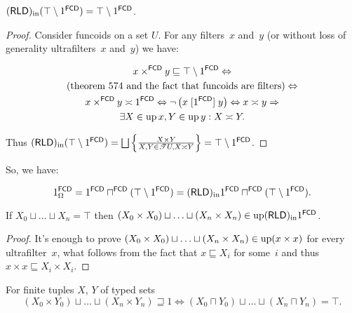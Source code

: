 \begin{prop}
$(\mathsf{RLD})_{\mathrm{in}} (\top \setminus 1^{\mathsf{FCD}}) = \top \setminus 1^{\mathsf{FCD}}$.
\end{prop}

\begin{proof}
Consider funcoids on a set $U$. For any filters~$x$ and~$y$ (or without loss of generality ultrafilters~$x$ and~$y$) we have:

\begin{multline*}
x \times^{\mathsf{FCD}} y \sqsubseteq \top \setminus
1^{\mathsf{FCD}} \Leftrightarrow \\ \text{(theorem 574 and the fact that
funcoids are filters)} \Leftrightarrow \\ x \times^{\mathsf{FCD}} y \asymp
1^{\mathsf{FCD}} \Leftrightarrow \neg \left( x
\mathrel{[1^{\mathsf{FCD}}]} y \right) \Leftrightarrow x \asymp y
\Rightarrow \\ \exists X \in \operatorname{up} x, Y \in \operatorname{up} y : X \asymp Y.
\end{multline*}

Thus $\torldin (\top \setminus
1^{\mathsf{FCD}}) = \bigsqcup \setcond{ X \times Y}
{X, Y \in \mathscr{T} U, X \asymp Y } = \top \setminus
1^{\mathsf{FCD}}$.
\end{proof}

So, we have:

\[
1^{\mathsf{FCD}}_{\Omega} =
1^{\mathsf{FCD}} \sqcap^{\mathsf{FCD}} (\top \setminus 1^{\mathsf{FCD}}) =
(\mathsf{RLD})_{\mathrm{in}} 1^{\mathsf{FCD}} \sqcap^{\mathsf{FCD}} (\top \setminus 1^{\mathsf{FCD}}).
\]

\begin{prop}\label{cj-rldin-diag}
  If $X_0 \sqcup \ldots \sqcup X_n = \top$ then $(X_0 \times X_0) \sqcup
  \ldots \sqcup (X_n \times X_n) \in \operatorname{up}
  (\mathsf{RLD})_{\mathrm{in}} 1^{\mathsf{FCD}}$.
\end{prop}

\begin{proof}
  It's enough to prove $(X_0 \times X_0) \sqcup \ldots \sqcup (X_n \times X_n)
  \in \operatorname{up} (x \times x)$ for every ultrafilter~$x$, what follows from the
  fact that $x \sqsubseteq X_i$ for some~$i$ and thus $x \times x \sqsubseteq
  X_i \times X_i$.
\end{proof}

\begin{prop}
  For finite tuples $X$, $Y$ of typed sets
  \[ (X_0 \times Y_0) \sqcup \ldots \sqcup (X_n \times Y_n) \sqsupseteq 1
     \Leftrightarrow (X_0 \sqcap Y_0) \sqcup \ldots \sqcup (X_n \sqcap Y_n) =
     \top . \]
\end{prop}


